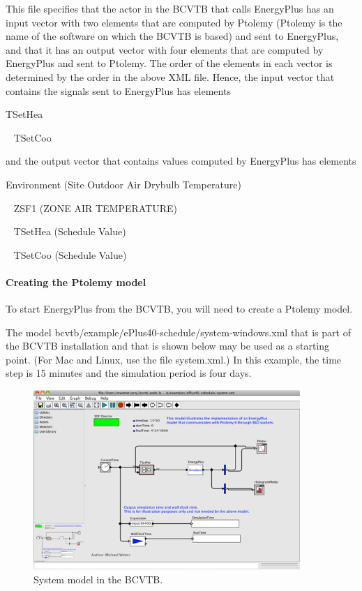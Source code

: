 This file specifies that the actor in the BCVTB that calls EnergyPlus has an input vector with two elements that are computed by Ptolemy (Ptolemy is the name of the software on which the BCVTB is based) and sent to EnergyPlus, and that it has an output vector with four elements that are computed by EnergyPlus and sent to Ptolemy. The order of the elements in each vector is determined by the order in the above XML file. Hence, the input vector that contains the signals sent to EnergyPlus has elements

TSetHea

~ TSetCoo

and the output vector that contains values computed by EnergyPlus has elements

Environment (Site Outdoor Air Drybulb Temperature)

~ ZSF1 (ZONE AIR TEMPERATURE)

~ TSetHea (Schedule Value)

~ TSetCoo (Schedule Value)

\paragraph{\textbf{Creating the Ptolemy model}}\label{creating-the-ptolemy-model}

To start EnergyPlus from the BCVTB, you will need to create a Ptolemy model.

The model bcvtb/example/ePlus40-schedule/system-windows.xml that is part of the BCVTB installation and that is shown below may be used as a starting point. (For Mac and Linux, use the file system.xml.) In this example, the time step is 15 minutes and the simulation period is four days.

\begin{figure}[hbtp] %
\centering
\includegraphics[width=0.9\textwidth, height=0.9\textheight, keepaspectratio=true]{media/image005.png}
\caption{System model in the BCVTB. \protect \label{fig:system-model-in-the-bcvtb.}}
\end{figure}

